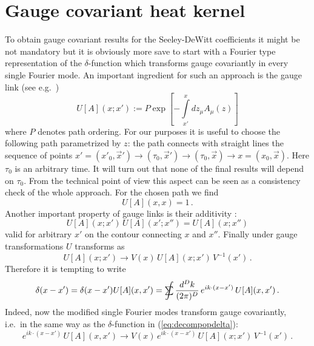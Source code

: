 \documentclass[a4paper,showpacs,showkeys,prd,nofootinbib]{revtex4}
\newcommand{\sumint}{\hbox{$\sum$}\!\!\!\!\!\!\!\int }
\begin{document}
\section{Gauge covariant heat kernel}
\label{sec:covheat}

To obtain gauge covariant results for the Seeley-DeWitt coefficients it might be
not mandatory but it is obviously
more save to start with a Fourier type representation of the $\delta$-function
which transforms gauge covariantly in every single Fourier mode. An important ingredient
for such an approach is the gauge link 
(see e.g.~\cite{Yang:1974kj,Bralic:1980ra,Elze:1986qd})
\begin{equation}
  \label{eq:defU}
U[A](x;x') := P \exp\left[ - \int\limits_{x'}^x \!\! dz_\mu A_\mu(z) \right]
\end{equation}
where $P$ denotes path ordering. For our purposes it is useful to choose the following
path parametrized by $z$: the path connects with straight lines the sequence of points 
$x'=(x'_0,\vec x') \to (\tau_0,\vec x') \to (\tau_0, \vec x) \to x=(x_0,\vec x)$.
Here $\tau_0$ is an arbitrary time. It will turn out that none of the final results 
will depend on $\tau_0$. From the technical point of view this aspect can be seen as 
a consistency check of the whole approach. 
For the chosen path we find
\begin{equation}
  \label{eq:U1}
U[A](x,x) = 1  \,.
\end{equation}
Another important property of gauge links is their additivity 
\cite{Yang:1974kj,Bralic:1980ra,Elze:1986qd}:
\begin{equation}
  \label{eq:Uadd}
U[A](x;x') \, U[A](x';x'') = U[A](x;x'')
\end{equation}
valid for arbitrary $x'$ on the contour connecting $x$ and $x''$. 
Finally under gauge transformations $U$ transforms as 
\cite{Yang:1974kj,Bralic:1980ra,Elze:1986qd}
\begin{equation}
  \label{eq:Utrafo}
U[A](x;x') \to V(x)\, U[A](x;x')  \, V^{-1}(x')  \,.
\end{equation}
Therefore it is tempting to write
\begin{equation}
  \label{eq:deltaprelim}
\delta(x-x') = \delta(x-x') U[A](x,x') 
= \sumint  {d^{D}k \over (2 \pi)^{D}} \, e^{i k \cdot (x - x')} \, U[A](x,x') \,.
\end{equation}
Indeed, now the modified single Fourier modes transform gauge covariantly, i.e.~in the 
same way as the $\delta$-function in (\ref{eq:decompopdelta}):
\begin{equation}
  \label{eq:trafomodfourier}
e^{i k \cdot (x - x')} \, U[A](x,x') \to 
V(x)\, e^{i k \cdot (x - x')} \, U[A](x;x')  \, V^{-1}(x')  \,.
\end{equation}
\end{document}
